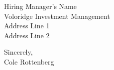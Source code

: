 \documentclass[11pt,a4paper]{letter}
\begin{document}
\begin{letter}{Hiring Manager's Name \\
Voloridge Investment Management \\
Address Line 1 \\
Address Line 2}
\closing{Sincerely,\\[1\baselineskip]
Cole Rottenberg}

\end{letter}
\end{document}
